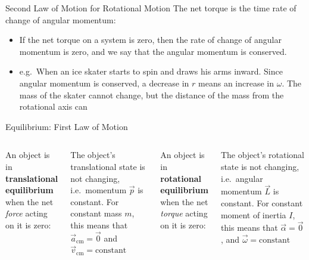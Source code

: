 \documentclass[12pt,compress,aspectratio=169]{beamer}
\begin{document}
\begin{frame}{Second Law of Motion for Rotational Motion}
  The net torque is the time rate of change of angular momentum:

  \begin{itemize}
  \item If the net torque on a system is zero, then the rate of change
    of angular momentum is zero, and we say that the angular momentum is
    conserved. 
  \item e.g.\ When an ice skater starts to spin and draws his arms inward.
    Since angular momentum is conserved, a decrease in $r$ means an increase in
    $\omega$. The mass of the skater cannot change, but the distance of the mass
    from the rotational axis can
  \end{itemize}
\end{frame}


\begin{frame}{Equilibrium: First Law of Motion}
  \begin{columns}
    An object is in \textbf{translational equilibrium}
    when the net \emph{force} acting on it is zero:
  

    The object's translational state is not changing, i.e.\
    momentum $\vec p$ is constant. For constant mass $m$, this means that
    $\vec a_\text{cm}=\vec 0$ and $\vec v_\text{cm}=\text{constant}$
    
    An object is in \textbf{rotational equilibrium} when
    the net \emph{torque} acting on it is zero:


    The object's rotational state is not changing, i.e.\
    angular momentum $\vec L$ is constant. For constant moment of inertia $I$,
    this means that $\vec\alpha=\vec 0$, and $\vec\omega=\text{constant}$
  \end{columns}
\end{frame}
\end{document}

